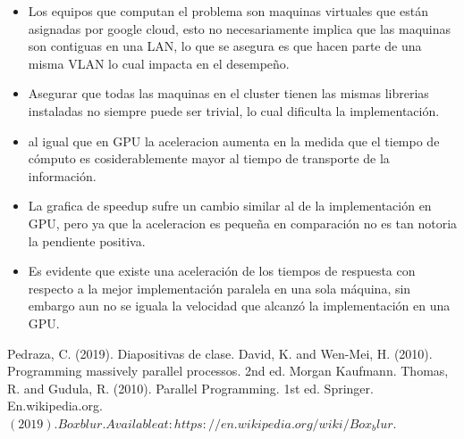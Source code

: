 \documentclass{IEEEtran}
\begin{document}
    \begin{itemize}
        \item Los equipos que computan el problema son maquinas virtuales que están asignadas por google cloud, esto no necesariamente implica que las maquinas son contiguas en una LAN, lo que se asegura es que hacen parte de una misma VLAN lo cual impacta en el desempeño. 
          \item Asegurar que todas las maquinas en el cluster tienen las mismas librerias instaladas no siempre puede ser trivial, lo cual dificulta la implementación.
          \item al igual que en GPU la aceleracion aumenta en la medida que el tiempo de cómputo es cosiderablemente mayor al tiempo de transporte de la información.
          \item La grafica de speedup sufre un cambio similar al de la implementación en GPU, pero ya que la aceleracion es pequeña en comparación no es tan notoria la pendiente positiva.
          \item Es evidente que existe una aceleración de los tiempos de respuesta con respecto a la mejor implementación paralela en una sola máquina, sin embargo aun no se iguala la velocidad que alcanzó la implementación en una GPU.
    \end{itemize}

\noindent 


\begin{thebibliography}{00}
 Pedraza, C. (2019). Diapositivas de clase.
David, K. and Wen-Mei, H. (2010). Programming massively parallel processos. 2nd ed. Morgan Kaufmann.
 Thomas, R. and Gudula, R. (2010). Parallel Programming. 1st ed. Springer.
 En.wikipedia.org. $(2019). Box blur.  Available at: https://en.wikipedia.org/wiki/Box_blur.$
\end{thebibliography}




\end{document}
